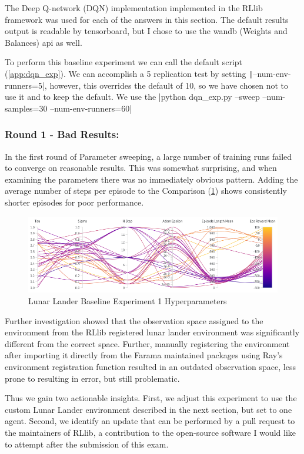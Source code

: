 \documentclass[12pt,letterpaper]{exam}
\begin{document}
\begin{questions}
\setcounter{question}{0}
	\question
	The Deep Q-network (DQN) implementation \cite{mnih2013,mnih2015}
	implemented in the RLlib framework \cite{liaw2018tune} was used for 
	each of the answers in this section.
	The default results output is readable by tensorboard, 
	but I chose to use the wandb (Weights and Balances) api as well.
	
	To perform this baseline experiment we can call the default script
	(\cref{app:dqn_exp}). We can accomplish a 5 replication test by setting
	\texttt|--num-env-runners=5|, however, this overrides the 
	default of 10, so we have chosen not to use it and to keep the default.
	We use the 
	|python dqn_exp.py --sweep --num-samples=30 --num-env-runners=60|

	\subsubsection*{Round 1 - Bad Results:}
	In the first round of Parameter sweeping, a large number of training runs
	failed to converge on reasonable results. This was somewhat surprising,
	and when examining the parameters there was no immediately obvious pattern.
	Adding the average number of steps per episode to the Comparison 
	(\cref{fig:baseline_1}) shows consistently shorter episodes for poor
	performance.
	\begin{figure}
		\centering
		\includegraphics[width=.75\linewidth]{baseline_1.png}
		\caption{Lunar Lander Baseline Experiment 1 Hyperparameters}
		\label{fig:baseline_1}
	\end{figure}
	Further investigation showed that the observation space assigned to the 
	environment from the RLlib registered lunar lander environment was
	significantly different from the correct space.
	Further, manually registering the environment after importing
	it directly from the Farama maintained packages using Ray's environment
	registration function resulted in an outdated observation space,
	less prone to resulting in error, but still problematic.

	Thus we gain two actionable insights. First, we adjust this experiment 
	to use the custom Lunar Lander environment described in the next section, 
	but set to one agent. Second, we identify an update that can be performed 
	by a pull request to the maintainers of RLlib, a contribution to the 
	open-source software I would like to attempt after the submission of this
	exam.




\end{questions}
\end{document}
